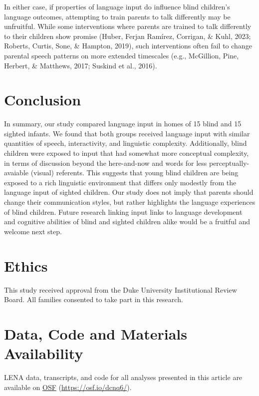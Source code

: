 \documentclass[
  man,floatsintext]{apa6}
\begin{document}
In either case, if properties of language input do influence blind children's language outcomes, attempting to train parents to talk differently may be unfruitful. While some interventions where parents are trained to talk differently to their children show promise (Huber, Ferjan Ramírez, Corrigan, \& Kuhl, 2023; Roberts, Curtis, Sone, \& Hampton, 2019), such interventions often fail to change parental speech patterns on more extended timescales (e.g., McGillion, Pine, Herbert, \& Matthews, 2017; Suskind et al., 2016).

\hypertarget{conclusion}{%
\section{Conclusion}\label{conclusion}}

In summary, our study compared language input in homes of 15 blind and 15 sighted infants. We found that both groups received language input with similar quantities of speech, interactivity, and linguistic complexity. Additionally, blind children were exposed to input that had somewhat more conceptual complexity, in terms of discussion beyond the here-and-now and words for less perceptually-avaiable (visual) referents. This suggests that young blind children are being exposed to a rich linguistic environment that differs only modestly from the language input of sighted children. Our study does not imply that parents should change their communication styles, but rather highlights the language experiences of blind children. Future research linking input links to language development and cognitive abilities of blind and sighted children alike would be a fruitful and welcome next step.

\hypertarget{ethics}{%
\section{Ethics}\label{ethics}}

This study received approval from the Duke University Institutional Review Board. All families consented to take part in this research.

\hypertarget{data-code-and-materials-availability}{%
\section{Data, Code and Materials Availability}\label{data-code-and-materials-availability}}

LENA data, transcripts, and code for all analyses presented in this article are available on \href{https://osf.io/dcnq6/}{OSF} (\url{https://osf.io/dcnq6/}).
\end{document}
